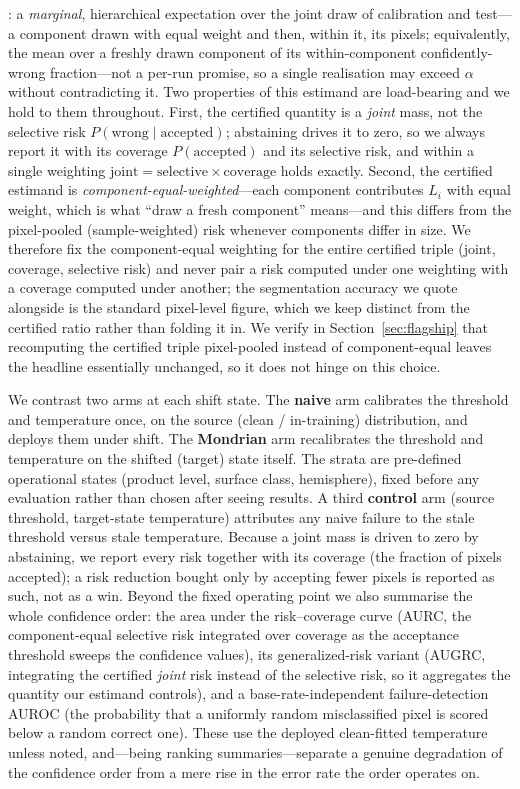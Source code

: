 \documentclass[preprint,3p,times]{elsarticle}
\begin{document}
\citep[Thm.~2.1]{angelopoulos2024}: a \emph{marginal}, hierarchical expectation over the joint draw of calibration and test---a component drawn with equal weight and then, within it, its pixels; equivalently, the mean over a freshly drawn component of its within-component confidently-wrong fraction---not a per-run promise, so a single realisation may exceed $\alpha$ without contradicting it. Two properties of this estimand are load-bearing and we hold to them throughout. First, the certified quantity is a \emph{joint} mass, not the selective risk $P(\text{wrong} \mid \text{accepted})$; abstaining drives it to zero, so we always report it with its coverage $P(\text{accepted})$ and its selective risk, and within a single weighting $\text{joint} = \text{selective} \times \text{coverage}$ holds exactly. Second, the certified estimand is \emph{component-equal-weighted}---each component contributes $L_i$ with equal weight, which is what ``draw a fresh component'' means---and this differs from the pixel-pooled (sample-weighted) risk whenever components differ in size. We therefore fix the component-equal weighting for the entire certified triple (joint, coverage, selective risk) and never pair a risk computed under one weighting with a coverage computed under another; the segmentation accuracy we quote alongside is the standard pixel-level figure, which we keep distinct from the certified ratio rather than folding it in. We verify in Section~\ref{sec:flagship} that recomputing the certified triple pixel-pooled instead of component-equal leaves the headline essentially unchanged, so it does not hinge on this choice.

We contrast two arms at each shift state. The \textbf{naive} arm calibrates the threshold and temperature once, on the source (clean / in-training) distribution, and deploys them under shift. The \textbf{Mondrian} arm recalibrates the threshold and temperature on the shifted (target) state itself. The strata are pre-defined operational states (product level, surface class, hemisphere), fixed before any evaluation rather than chosen after seeing results. A third \textbf{control} arm (source threshold, target-state temperature) attributes any naive failure to the stale threshold versus stale temperature. Because a joint mass is driven to zero by abstaining, we report every risk together with its coverage (the fraction of pixels accepted); a risk reduction bought only by accepting fewer pixels is reported as such, not as a win. Beyond the fixed operating point we also summarise the whole confidence order: the area under the risk--coverage curve (AURC, the component-equal selective risk integrated over coverage as the acceptance threshold sweeps the confidence values), its generalized-risk variant (AUGRC, integrating the certified \emph{joint} risk instead of the selective risk, so it aggregates the quantity our estimand controls), and a base-rate-independent failure-detection AUROC (the probability that a uniformly random misclassified pixel is scored below a random correct one). These use the deployed clean-fitted temperature unless noted, and---being ranking summaries---separate a genuine degradation of the confidence order from a mere rise in the error rate the order operates on.
\end{document}
